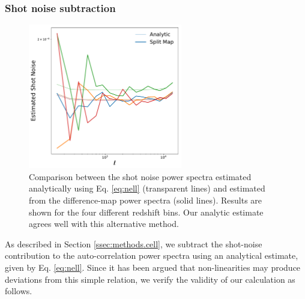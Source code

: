 \documentclass[a4paper,11pt]{article}
\begin{document}
    \subsubsection{Shot noise subtraction} \label{sssec:results.spectra.shotnoise}
      \begin{figure}
        \centering
        \includegraphics[width=0.6\textwidth]{figures/shotnoise_avg.pdf}
        \caption{Comparison between the shot noise power spectra estimated analytically using Eq. \ref{eq:nell} (transparent lines) and estimated from the difference-map power spectra (solid lines). Results are shown for the four different redshift bins. Our analytic estimate agrees well with this alternative method.}
        \label{fig:shotnoise_avg}
      \end{figure}
      As described in Section \ref{ssec:methods.cell}, we subtract the shot-noise contribution to the auto-correlation power spectra using an analytical estimate, given by Eq. \ref{eq:nell}. Since it has been argued \citep{2013PhRvD..88h3507B} that non-linearities may produce deviations from this simple relation, we verify the validity of our calculation as follows.
      
\end{document}
